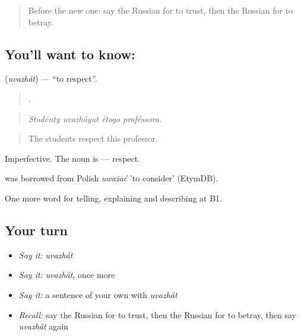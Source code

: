\label{lesson:RU-C479-uvazhat}



\begin{quote}
Before the new one: say the Russian for to trust, then the Russian for to betray.
\end{quote}

\subsection*{You'll want to know: }
\textbf{} (\emph{uvazhát}) — \textquotedblleft{}to respect\textquotedblright{}.

\begin{quote}
   .
\end{quote}

\begin{quote}
\emph{Studénty uvazháyut étogo proféssora.}
\end{quote}

\begin{quote}
The students respect this professor.
\end{quote}

Imperfective. The noun is \emph{} — respect.

\begin{cousinweb}
\emph{} was borrowed from Polish \emph{uważać} 'to consider' (EtymDB).
\end{cousinweb}

\begin{grammarlens}[title={What you've built}]
One more word for telling, explaining and describing at B1.
\end{grammarlens}

\subsection*{Your turn}
\begin{itemize}
\raggedright
  \item \emph{Say it:} \emph{uvazhát}
  \item \emph{Say it:} \emph{uvazhát}, once more
  \item \emph{Say it:} a sentence of your own with \emph{uvazhát}
  \item \emph{Recall:} say the Russian for to trust, then the Russian for to betray, then say \emph{uvazhát} again
\end{itemize}

